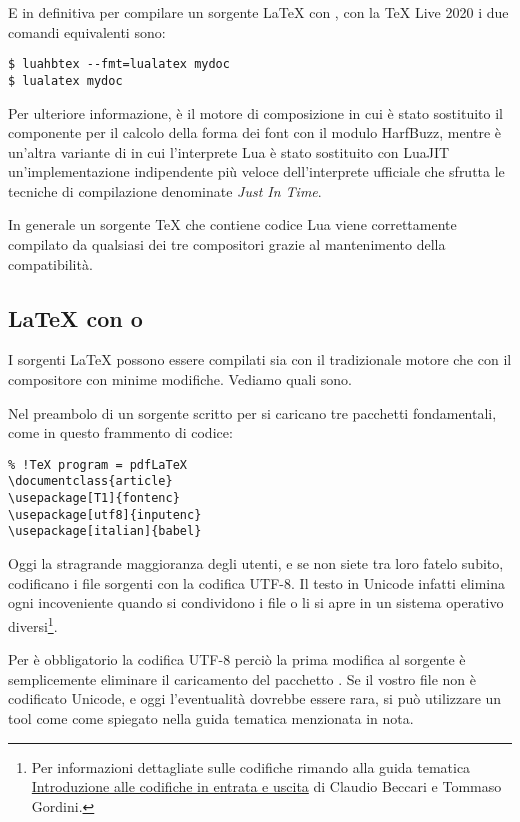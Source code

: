 E in definitiva per compilare un sorgente \LaTeX{} con \LuaLaTeX{}, con la TeX
Live 2020 i due comandi equivalenti sono:
\begin{Verbatim}[numbers=none]
$ luahbtex --fmt=lualatex mydoc
$ lualatex mydoc
\end{Verbatim}

Per ulteriore informazione,  è il motore di composizione
 in cui è stato sostituito il componente per il calcolo della
forma dei font con il modulo HarfBuzz, mentre  è un'altra
variante di  in cui l'interprete Lua è stato sostituito con
LuaJIT un'implementazione indipendente più veloce dell'interprete ufficiale che
sfrutta le tecniche di compilazione denominate \emph{Just In Time}.

In generale un sorgente \TeX{} che contiene codice Lua viene correttamente
compilato da qualsiasi dei tre compositori grazie al mantenimento della
compatibilità.


\subsection{\LaTeX{} con  o }

I sorgenti \LaTeX{} possono essere compilati sia con il tradizionale motore
 che con il compositore  con minime modifiche.
Vediamo quali sono.

Nel preambolo di un sorgente scritto per  si caricano tre
pacchetti fondamentali, come in questo frammento di codice:
\begin{Verbatim}
% !TeX program = pdfLaTeX
\documentclass{article}
\usepackage[T1]{fontenc}
\usepackage[utf8]{inputenc}
\usepackage[italian]{babel}
\end{Verbatim}

Oggi la stragrande maggioranza degli utenti, e se non siete tra loro fatelo
subito, codificano i file sorgenti con la codifica UTF-8. Il testo in Unicode
infatti elimina ogni incoveniente quando si condividono i file o li si apre in
un sistema operativo diversi\footnote{Per informazioni dettagliate sulle
codifiche rimando alla guida tematica \GuIT{}
\href{http://www.guitex.org/home/images/doc/GuideGuIT/introcodifiche.pdf}{%
Introduzione alle codifiche in entrata e uscita} di Claudio Beccari e Tommaso
Gordini.}.

Per \LuaTeX{} è obbligatorio la codifica UTF-8 perciò la prima modifica al
sorgente è semplicemente eliminare il caricamento del pacchetto .
Se il vostro file non è codificato Unicode, e oggi l'eventualità dovrebbe essere
rara, si può utilizzare un tool come  come spiegato nella guida
tematica menzionata in nota.

